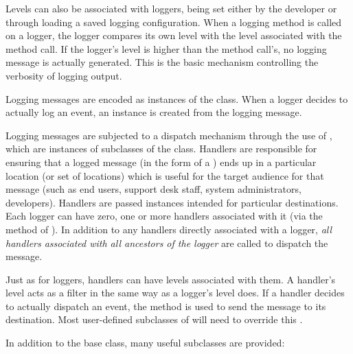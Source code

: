 Levels can also be associated with loggers, being set either by the
developer or through loading a saved logging configuration. When a
logging method is called on a logger, the logger compares its own
level with the level associated with the method call. If the logger's
level is higher than the method call's, no logging message is actually
generated. This is the basic mechanism controlling the verbosity of
logging output.

Logging messages are encoded as instances of the  class.
When a logger decides to actually log an event, an 
instance is created from the logging message.

Logging messages are subjected to a dispatch mechanism through the
use of , which are instances of subclasses of the
 class. Handlers are responsible for ensuring that a logged
message (in the form of a ) ends up in a particular
location (or set of locations) which is useful for the target audience for
that message (such as end users, support desk staff, system administrators,
developers). Handlers are passed  instances intended for
particular destinations. Each logger can have zero, one or more handlers
associated with it (via the  method of ).
In addition to any handlers directly associated with a logger,
\emph{all handlers associated with all ancestors of the logger} are
called to dispatch the message.

Just as for loggers, handlers can have levels associated with them.
A handler's level acts as a filter in the same way as a logger's level does.
If a handler decides to actually dispatch an event, the  method
is used to send the message to its destination. Most user-defined subclasses
of  will need to override this .

In addition to the base  class, many useful subclasses
are provided:

